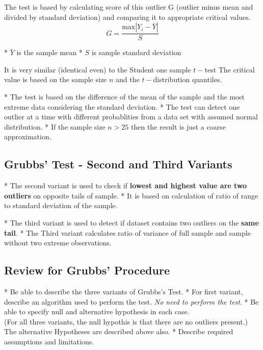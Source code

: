 The test is based by calculating score of this outlier G (outlier minus mean and divided
by standard deviation) and comparing it to appropriate critical values.
\[ G = \frac{\mbox{max}|Y_i-\bar{Y}|}{S} \]


*  $\bar{Y}$ is the sample mean
*  $S$ is sample standard deviation

It is very similar (identical even) to the Student one sample $t-$test
The critical value is based on the sample size $n$ and the $t-$distribution quantiles. 



*  The test is based on the difference of the mean of the sample and the most
extreme data considering the standard deviation.
*  The test can detect one outlier at a time with different probablities from a data set with assumed normal distribution. 
*  If the sample size $n>25$ then the result is
just a coarse approximation.


\subsection{Grubbs' Test - Second and Third Variants}



*  The second variant is used to check if \textbf{lowest and highest value are two outliers} on opposite tails of
sample. 
*  It is based on calculation of ratio of range to standard deviation of the sample.

*  The third variant is used to detect if dataset contains two outliers on the \textbf{same tail}.
*  The Third variant calculates ratio of variance of full sample and sample without two extreme observations.




\subsection{Review for Grubbs' Procedure}

*  Be able to describe the three variants of Grubbs's Test.
*  For first variant, describe an algorithm used to perform the test. \textit{No need to perform the test}.
*  Be able to specify null and alternative hypothesis in each case.\\ (For all three variants, the null hypothis is that there are no outliers present.) \\ The alternative Hypotheses are described above also.
*  Describe required assumptions and limitations.


